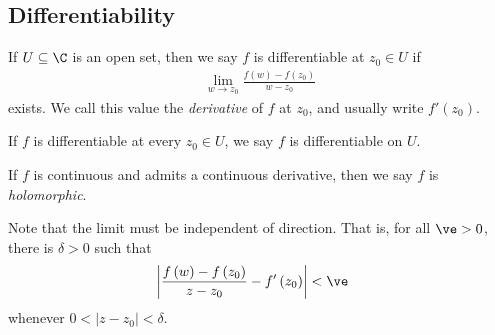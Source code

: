 \documentclass[10pt]{mypackage}
\begin{document}
\subsection{Differentiability}%
\begin{definition}
  If $U\subseteq \C$ is an open set, then we say $f$ is differentiable at $z_0\in U$ if
  \begin{align*}
    \lim_{w\rightarrow z_0} \frac{f\left( w \right)-f\left( z_0 \right)}{w-z_0}
  \end{align*}
  exists. We call this value the \textit{derivative} of $f$ at $z_0$, and usually write $f'\left(z_0\right)$.\newline

  If $f$ is differentiable at every $z_0\in U$, we say $f$ is differentiable on $U$.\newline

  If $f$ is continuous and admits a continuous derivative, then we say $f$ is \textit{holomorphic}.
\end{definition}
Note that the limit must be independent of direction. That is, for all $\ve > 0$, there is $\delta > 0$ such that
\begin{align*}
  \left\vert \frac{f\left( w \right)-f\left( z_0 \right)}{z-z_0} - f'\left( z_0 \right) \right\vert &< \ve
\end{align*}
whenever $0 < \left\vert z-z_0 \right\vert < \delta$.\newline
\end{document}
